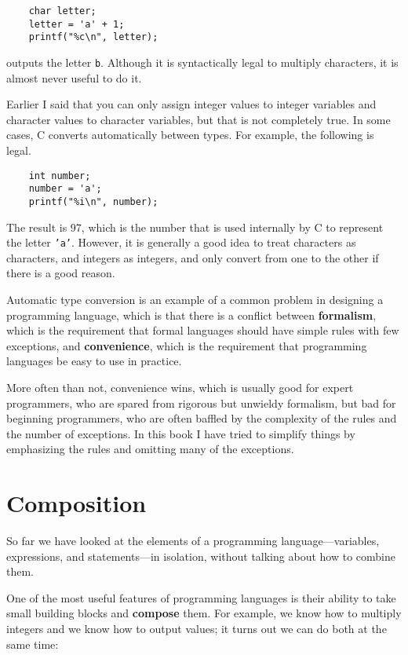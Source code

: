 \begin{verbatim}
    char letter;
    letter = 'a' + 1;
    printf("%c\n", letter);
\end{verbatim}
%
outputs the letter {\tt b}.  Although it is syntactically legal
to multiply characters, it is almost never useful to do it.

Earlier I said that you can only assign integer values to
integer variables and character values to character variables,
but that is not completely true.  In some cases, C converts
automatically between types.  For example, the following is
legal.

\begin{verbatim}
    int number;
    number = 'a';
    printf("%i\n", number);
\end{verbatim}
%
The result is 97, which is the number that is used internally
by C to represent the letter {\tt 'a'}.  However, it is
generally a good idea to treat characters as characters, and
integers as integers, and only convert from one to the other
if there is a good reason.

Automatic type conversion is an example of a common problem in designing a
programming language, which is that there is a conflict between {\bf
formalism}, which is the requirement that formal languages should have
simple rules with few exceptions, and {\bf convenience}, which is the
requirement that programming languages be easy to use in practice.

More often than not, convenience wins, which is usually good for
expert programmers, who are spared from rigorous but unwieldy
formalism, but bad for beginning programmers, who are often baffled
by the complexity of the rules and the number of exceptions.  In this
book I have tried to simplify things by emphasizing the rules and
omitting many of the exceptions.


\section{Composition}

So far we have looked at the elements of a programming
language---variables, expressions, and statements---in
isolation, without talking about how to combine them.

One of the most useful features of programming languages
is their ability to take small building blocks and
{\bf compose} them.  For example, we know how to multiply
integers and we know how to output values; it turns out we can
do both at the same time:

